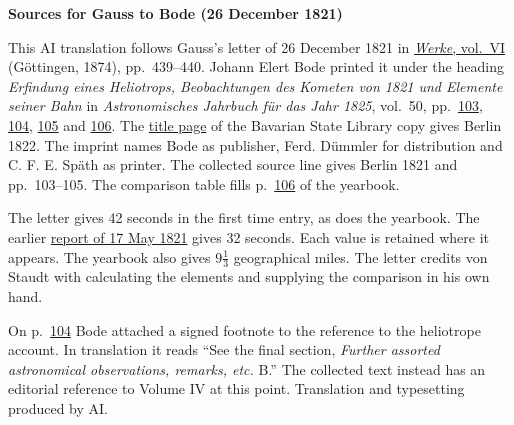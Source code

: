 \clearpage\thispagestyle{empty}
\begin{center}\textbf{Sources for Gauss to Bode (26 December 1821)}\end{center}
\noindent This AI translation follows Gauss’s letter of 26 December 1821 in \href{https://gdz.sub.uni-goettingen.de/id/PPN236007467}{\textit{Werke}, vol.~VI} (Göttingen, 1874), pp.~439--440. Johann Elert Bode printed it under the heading \textit{Erfindung eines Heliotrops, Beobachtungen des Kometen von 1821 und Elemente seiner Bahn} in \textit{Astronomisches Jahrbuch für das Jahr 1825}, vol.~50, pp.~\href{https://api.digitale-sammlungen.de/iiif/image/v2/bsb10538354_00109/full/1600,/0/default.jpg}{103}, \href{https://api.digitale-sammlungen.de/iiif/image/v2/bsb10538354_00110/full/1600,/0/default.jpg}{104}, \href{https://api.digitale-sammlungen.de/iiif/image/v2/bsb10538354_00111/full/1600,/0/default.jpg}{105} and \href{https://api.digitale-sammlungen.de/iiif/image/v2/bsb10538354_00112/full/1600,/0/default.jpg}{106}. The \href{https://api.digitale-sammlungen.de/iiif/image/v2/bsb10538354_00003/full/1600,/0/default.jpg}{title page} of the Bavarian State Library copy gives Berlin 1822. The imprint names Bode as publisher, Ferd. Dümmler for distribution and C. F. E. Späth as printer. The collected source line gives Berlin 1821 and pp.~103--105. The comparison table fills p.~\href{https://api.digitale-sammlungen.de/iiif/image/v2/bsb10538354_00112/full/1600,/0/default.jpg}{106} of the yearbook.
\par\smallskip\noindent The letter gives 42 seconds in the first time entry, as does the yearbook. The earlier \hyperlink{native-442-part-lower}{report of 17 May 1821} gives 32 seconds. Each value is retained where it appears. The yearbook also gives $9\tfrac{1}{3}$ geographical miles. The letter credits von Staudt with calculating the elements and supplying the comparison in his own hand.
\par\smallskip\noindent On p.~\href{https://api.digitale-sammlungen.de/iiif/image/v2/bsb10538354_00110/full/1600,/0/default.jpg}{104} Bode attached a signed footnote to the reference to the heliotrope account. In translation it reads “See the final section, \textit{Further assorted astronomical observations, remarks, etc.} B.” The collected text instead has an editorial reference to Volume IV at this point. Translation and typesetting produced by AI.
\clearpage
